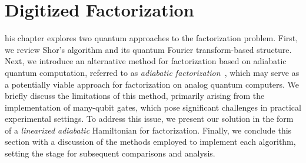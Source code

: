 \chapter{Digitized Factorization}
\label{Chapter:Factorization}

his chapter explores two quantum approaches to the factorization problem. First, we review
Shor's algorithm and its quantum Fourier transform-based structure. Next, we introduce an alternative method for factorization based on adiabatic quantum computation, referred to as \textit{adiabatic factorization}~\cite{peng_quantum_2008}, which may serve as a potentially viable approach for factorization on analog quantum computers. We briefly discuss the limitations of this method, primarily arising from the implementation of many-qubit gates, which pose significant challenges in practical experimental settings. To address this issue, we present our solution in the form of a \textit{linearized adiabatic} Hamiltonian for factorization. Finally, we conclude this section with a discussion of the methods employed to implement each algorithm, setting the stage for subsequent comparisons and analysis.